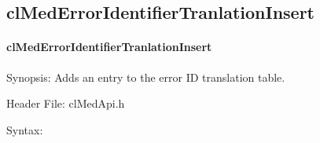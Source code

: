 \begin{flushleft}
\subsection{clMedErrorIdentifierTranlationInsert}
\hypertarget{pagemed108}{}\paragraph{cl\-Med\-Error\-Identifier\-Tranlation\-Insert}\label{pagemed108}
\begin{Desc}
\item[Synopsis:]Adds an entry to the error ID translation table.\end{Desc}
\begin{Desc}
\item[Header File:]clMedApi.h\end{Desc}
\begin{Desc}	
\item[Syntax:]


\end{Desc}
\end{flushleft}
